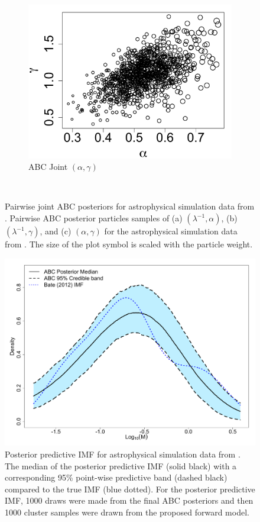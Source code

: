 \documentclass[ejs]{imsart}
\numberwithin{equation}{section}
\theoremstyle{plain}
\begin{document}
\begin{figure}[htbp]
\begin{subfigure}{0.32\textwidth}
\centering
\includegraphics[width = \textwidth]{figures/bate_joint_alpha_gamma.pdf} 
\caption{ABC Joint $(\alpha, \gamma)$}\label{subfig:joint_gamma_alpha_bate}
\end{subfigure} \\
\caption{
Pairwise joint ABC posteriors for astrophysical simulation data from \cite{Bate2012}.  Pairwise ABC posterior particles samples of (a) $(\lambda^{-1}, \alpha)$, (b) $(\lambda^{-1}, \gamma)$, and (c) $(\alpha, \gamma)$ for the astrophysical simulation data from \cite{Bate2012}.  The size of the plot symbol is scaled with the particle weight.
}
\label{fig:abc_bate_joints}
\end{figure}





\begin{figure}[htbp]
\centering
\includegraphics[width=.5\textwidth]{figures/bate_pred_imf.pdf}
 \caption{Posterior predictive IMF for astrophysical simulation data from \cite{Bate2012}. 
The median of the posterior predictive IMF (solid black) with a corresponding 95\% point-wise predictive band (dashed black) compared to the true IMF (blue dotted).  For the posterior predictive IMF, 1000 draws were made from the final ABC posteriors and then 1000 cluster samples were drawn from the proposed forward model.  
} \label{fig:abc_bate_pred}
\end{figure}
\end{document}
